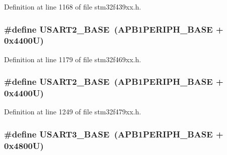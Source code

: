 Definition at line 1168 of file stm32f439xx.\+h.

\subsubsection[{\texorpdfstring{U\+S\+A\+R\+T2\+\_\+\+B\+A\+SE}{USART2_BASE}}]{\setlength{\rightskip}{0pt plus 5cm}\#define U\+S\+A\+R\+T2\+\_\+\+B\+A\+SE~({\bf A\+P\+B1\+P\+E\+R\+I\+P\+H\+\_\+\+B\+A\+SE} + 0x4400\+U)}\hypertarget{group___peripheral__memory__map_gade83162a04bca0b15b39018a8e8ec090}{}\label{group___peripheral__memory__map_gade83162a04bca0b15b39018a8e8ec090}


Definition at line 1179 of file stm32f469xx.\+h.

\subsubsection[{\texorpdfstring{U\+S\+A\+R\+T2\+\_\+\+B\+A\+SE}{USART2_BASE}}]{\setlength{\rightskip}{0pt plus 5cm}\#define U\+S\+A\+R\+T2\+\_\+\+B\+A\+SE~({\bf A\+P\+B1\+P\+E\+R\+I\+P\+H\+\_\+\+B\+A\+SE} + 0x4400\+U)}\hypertarget{group___peripheral__memory__map_gade83162a04bca0b15b39018a8e8ec090}{}\label{group___peripheral__memory__map_gade83162a04bca0b15b39018a8e8ec090}


Definition at line 1249 of file stm32f479xx.\+h.

\subsubsection[{\texorpdfstring{U\+S\+A\+R\+T3\+\_\+\+B\+A\+SE}{USART3_BASE}}]{\setlength{\rightskip}{0pt plus 5cm}\#define U\+S\+A\+R\+T3\+\_\+\+B\+A\+SE~({\bf A\+P\+B1\+P\+E\+R\+I\+P\+H\+\_\+\+B\+A\+SE} + 0x4800\+U)}\hypertarget{group___peripheral__memory__map_gabe0d6539ac0026d598274ee7f45b0251}{}\label{group___peripheral__memory__map_gabe0d6539ac0026d598274ee7f45b0251}


